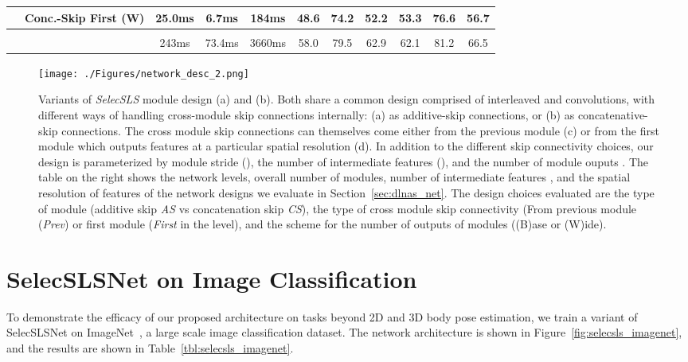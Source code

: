 \documentclass[acmtog,authorversion]{acmart}
\newcommand{\change}[1]{{{#1}}}
\begin{document}
\begin{table}[t]
{\begin{tabular}{l|ccc|ccc|ccc}
~~Conc.-Skip First (W) & 25.0ms         & 6.7ms                    & 184ms                          & 48.6                 & 74.2                 & 52.2                  & 53.3                 & 76.6                 & 56.7                 \\ \hline \multicolumn{10}{l}{}\\ \hline
\cite{cao_affinity_2017}            & 243ms        & 73.4ms                   & 3660ms                         & 58.0                   & 79.5                 & 62.9                  & 62.1                 & 81.2                 & 66.5                
\end{tabular}
}
%
 \label{tbl:coco_eval}
\end{table}



\begin{figure*}[t]
  \texttt{[image: ./Figures/network\_desc\_2.png]}
  \caption
  {Variants of \textit{SelecSLS} module design (a) and (b). Both share a common design comprised of interleaved  and  convolutions, with different ways of handling cross-module skip connections internally: (a) as additive-skip connections, or (b) as concatenative-skip connections. The cross module skip connections can themselves come either from the previous module (c) or from the first module which outputs features at a particular spatial resolution (d). In addition to the different skip connectivity choices, our design is parameterized by module stride (), the number of intermediate features (), and the number of module ouputs .
 The table on the right shows the network levels, overall number of modules, number of intermediate features , and the spatial resolution of features of the network designs we evaluate in Section~\ref{sec:dlnas_net}. The design choices evaluated are the type of module (additive skip \textit{AS} vs concatenation skip \textit{CS}), the type of cross module skip connectivity (From previous module (\textit{Prev}) or first module (\textit{First} in the level), and the scheme for the number of outputs of modules  ((B)ase or (W)ide). 
  }
  \label{fig:network_module_full}
\end{figure*}

\section{SelecSLSNet on Image Classification}
\change{To demonstrate the efficacy of our proposed architecture on tasks beyond 2D and 3D body pose estimation, we train a variant of SelecSLSNet on ImageNet~\cite{imagenet_ijcv2015}, a large scale image classification dataset. The network architecture is shown in Figure~\ref{fig:selecsls_imagenet}, and the results are shown in Table~\ref{tbl:selecsls_imagenet}.}
\end{document}
